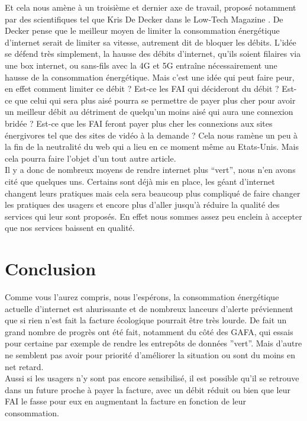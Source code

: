 \documentclass[a4paper,twocolumn,12pt]{article}
\begin{document}
	Et cela nous amène à un troisième et dernier axe de travail, proposé notamment par des scientifiques tel que Kris De Decker dans le Low-Tech Magazine \cite{4}. De Decker pense que le meilleur moyen de limiter la consommation énergétique d’internet serait de limiter sa vitesse, autrement dit de bloquer les débits. L’idée se défend très simplement, la hausse des débits d’internet, qu’ils soient filaires via une box internet, ou sans-fils avec la 4G et 5G entraîne nécessairement une hausse de la consommation énergétique. Mais c’est une idée qui peut faire peur, en effet comment limiter ce débit ? Est-ce les FAI qui décideront du débit ? Est-ce que celui qui sera plus aisé pourra se permettre de payer plus cher pour avoir un meilleur débit au détriment de quelqu'un moins aisé qui aura une connexion bridée ? Est-ce que les FAI feront payer plus cher les connexions aux sites énergivores tel que des sites de vidéo à la demande ? Cela nous ramène un peu à la fin de la neutralité du web qui a lieu en ce moment même au Etats-Unis. Mais cela pourra faire l'objet d'un tout autre article. \\
	
	Il y a donc de nombreux moyens de rendre internet plus “vert”, nous n’en avons cité que quelques uns. Certains sont déjà mis en place, les géant d'internet changent leurs pratiques mais cela sera beaucoup plus compliqué de faire changer les pratiques des usagers et encore plus d’aller jusqu’à réduire la qualité des services qui leur sont proposés. En effet nous sommes assez peu enclein à accepter que nos services baissent en qualité.
	
\section{Conclusion} 

	Comme vous l’aurez compris, nous l’espérons, la consommation énergétique actuelle d’internet est ahurissante et de nombreux lanceurs d’alerte préviennent que si rien n’est fait la facture écologique pourrait être très lourde. De fait un grand nombre de progrès ont été fait, notamment du côté des GAFA, qui essais pour certaine par exemple de rendre les entrepôts de données ''vert''. Mais d’autre ne semblent pas avoir pour priorité d’améliorer la situation ou sont du moins en net retard. \\

	Aussi si les usagers n’y sont pas encore sensibilisé, il est possible qu’il se retrouve dans un future proche à payer la facture, avec un débit réduit ou bien que leur FAI le fasse pour eux en augmentant la facture en fonction de leur consommation. \\
\end{document}
